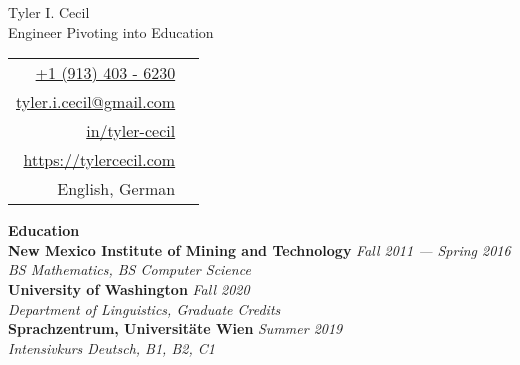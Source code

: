 \documentclass[11pt,a4paper,sans]{article}
\newcommand{\cvcolor}[1]{{\color{MidnightBlue}#1}}
\renewcommand{\section}[1]{
  \cvcolor{\noindent \textbf{\LARGE #1}}
  \vspace{.5em}\\
}
\begin{document}
\noindent
\begin{minipage}{0.675\linewidth}
  \vspace{1.75em}
  {
    \fontsize{40pt}{50pt}\selectfont
    \noindent
    Tyler I. Cecil
  }\\
  {\Large \color{darkgray}
    {
      \noindent
      Engineer Pivoting into Education
    }
  }
\end{minipage}
\hfill
\begin{tabular}{|rl}
  \href{tel:+1 (913) 403 - 6230}{+1 (913) 403 - 6230}&\cvcolor{\faPhone} \\
  \href{mailto:tyler.i.cecil@gmail.com}{tyler.i.cecil@gmail.com}&\cvcolor{\faEnvelope} \\
  \href{https://www.linkedin.com/in/tyler-cecil/}{in/tyler-cecil}&\cvcolor{\faLinkedinSquare} \\
  \href{https://tylercecil.com}{https://tylercecil.com}&\cvcolor{\faGlobe} \\
  English, German & \cvcolor{\faLanguage} \\
\end{tabular}

\vspace{0.5em}
\noindent\hrulefill
\vspace{1em}

\section{Education}
\textbf{New Mexico Institute of Mining and Technology} \hfill \textsl{Fall 2011 --- Spring 2016}\\
\textsl{BS Mathematics, BS Computer Science}\\
\textbf{University of Washington} \hfill \textsl{Fall 2020}\\
\textsl{Department of Linguistics, Graduate Credits}\\
\textbf{Sprachzentrum, Universitäte Wien} \hfill \textsl{Summer 2019}\\
\textsl{Intensivkurs Deutsch, B1, B2, C1}\\
\end{document}

